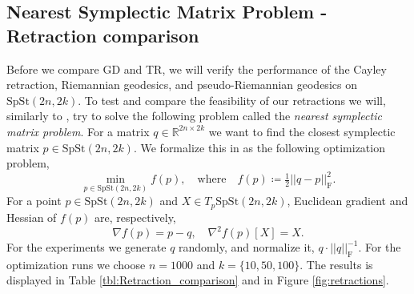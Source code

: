 \subsection{Nearest Symplectic Matrix Problem - Retraction comparison}\label{sec:retraction_comparison}
Before we compare GD and TR, we will verify the performance of the Cayley retraction, Riemannian geodesics, and pseudo-Riemannian geodesics on $\mathrm{SpSt}(2n, 2k)$. 
To test and compare the feasibility of our retractions we will, similarly to \cite[p.~25]{BendokatZimmermann2021}, try to solve the following problem called the \textit{nearest symplectic matrix problem}. For a matrix $q\in \mathbb{R}^{2n\times2k}$ we want to find the closest symplectic matrix $p \in \mathrm{SpSt}(2n, 2k)$. We formalize this in as the following optimization problem, 
%
\begin{equation}\label{eq:nearest_symplectic_matrix}
\operatorname*{min}_{p \in \mathrm{SpSt}(2n, 2k)}f(p),\quad\text{where}\quad f(p)\coloneqq\tfrac{1}{2}\lvert \lvert q-p \rvert \rvert^{2}_{\text{F}}.
\end{equation}
%
For a point $p\in \mathrm{SpSt}(2n, 2k)$ and $X\in T_{p}\mathrm{SpSt}(2n, 2k)$, Euclidean gradient and Hessian of $f(p)$ are, respectively,
%
\begin{equation*}
\nabla f(p)=p-q,\quad \nabla^{2}f(p)[X]=X.
\end{equation*}
%
For the experiments we generate $q$ randomly, and normalize it, $q\cdot\lvert \lvert q \rvert \rvert^{-1}_{\text{F}}$. For the optimization runs we choose $n=1000$ and $k=\{10,50,100\}$. The results is displayed in Table \ref{tbl:Retraction_comparison} and in Figure \ref{fig:retractions}. 


